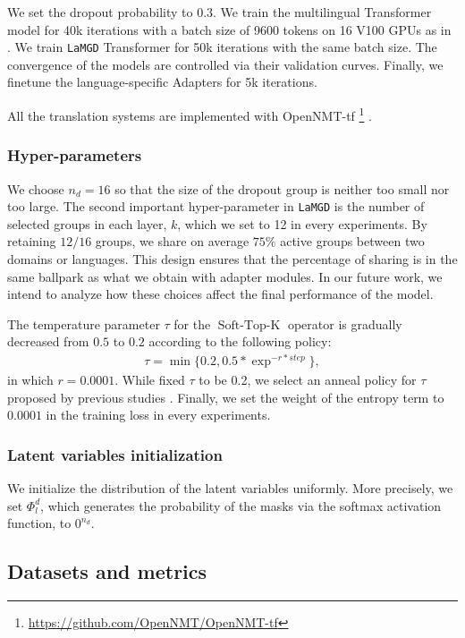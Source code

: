 \documentclass[11pt]{article}
\newcommand{\fyDone}[1]{\done[FY]\Todo[FY:]{\textcolor{orange}{#1}}}
\newcommand{\system}[1]{\texttt{{#1}}}
\begin{document}
We set the dropout probability to 0.3. We train the multilingual Transformer model for 40k iterations with a batch size of 9600 tokens on 16 V100 GPUs as in \citet{Gong21adaptive}. We train \system{LaMGD} Transformer for 50k iterations with the same batch size. The convergence of the models are controlled via their validation curves. Finally, we finetune the language-specific Adapters for 5k iterations.

All the translation systems are implemented with OpenNMT-tf \footnote{\url{https://github.com/OpenNMT/OpenNMT-tf}} \cite{Klein17opennmt}.\fyDone{Fix this, add reference to framework if needed}

\subsubsection{Hyper-parameters}
\label{ssec:hyperparams}
We choose $n_d = 16$ so that the size of the dropout group is neither too small nor too large. The second important hyper-parameter in \system{LaMGD} is the number of selected groups in each layer, $k$, which we set to 12 in every experiments. By retaining $12/16$ groups, we share on average $75 \%$ active groups between two domains or languages. This design ensures that the percentage of sharing is in the same ballpark as what we obtain with adapter modules. In our future work, we intend to analyze how these choices affect the final performance of the model.

The temperature parameter $\tau$ for the $\operatorname{Soft-Top-K}$ operator is gradually decreased from $0.5$ to $0.2$ according to the following policy:
\begin{align*}
\tau = \operatorname{min}\{ 0.2, 0.5 * \exp^{-r*step} \},
\end{align*}
in which $r=0.0001$.
While \citet{Gong21pay,Gong21adaptive} fixed $\tau$ to be 0.2, we select an anneal policy for $\tau$ proposed by previous studies \citep{Jang17categorical}. Finally, we set the weight of the entropy term to $0.0001$ in the training loss in every experiments.
\subsubsection{Latent variables initialization}
We initialize the distribution of the latent variables uniformly. More precisely, we set $\Phi_l^d$, which generates the probability of the masks via the softmax activation function, to $0^{n_d}$.
\subsection{Datasets and metrics}
\end{document}
